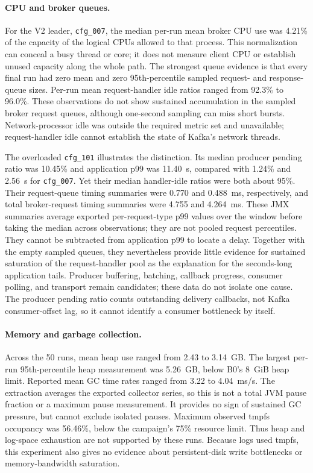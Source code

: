 \documentclass[10pt]{article}
\begin{document}
\paragraph{CPU and broker queues.}
For the V2 leader, \texttt{cfg\_007}, the median per-run mean broker CPU use
was 4.21\% of the capacity of the logical CPUs allowed to that process. This normalization
can conceal a busy thread or core; it does not measure client CPU or establish
unused capacity along the whole path. The strongest queue evidence is that
every final run had zero mean and zero 95th-percentile sampled request- and
response-queue sizes. Per-run mean request-handler idle ratios ranged from
92.3\% to 96.0\%. These observations do not show sustained accumulation in
the sampled broker request queues, although one-second sampling can miss
short bursts. Network-processor idle was outside the required metric set and unavailable;
request-handler idle cannot establish the state of Kafka's network threads.

The overloaded \texttt{cfg\_101} illustrates the distinction. Its median
producer pending ratio was 10.45\% and application p99 was 11.40~s, compared
with 1.24\% and 2.56~s for \texttt{cfg\_007}. Yet their median handler-idle
ratios were both about 95\%. Their request-queue timing summaries were
0.770 and 0.488~ms, respectively, and total broker-request timing summaries
were 4.755 and 4.264~ms. These JMX summaries average exported per-request-type
p99 values over the window before taking the median across observations; they
are not pooled request percentiles. They cannot be subtracted from
application p99 to locate a delay. Together with the empty sampled queues,
they nevertheless provide little evidence for sustained saturation of the
request-handler pool as the explanation for the seconds-long application
tails. Producer buffering, batching, callback progress, consumer polling,
and transport remain candidates; these data do not isolate one cause.
The producer pending ratio counts outstanding delivery callbacks, not Kafka
consumer-offset lag, so it cannot identify a consumer bottleneck by itself.

\paragraph{Memory and garbage collection.}
Across the 50 runs, mean heap use ranged from 2.43 to 3.14~GB. The largest
per-run 95th-percentile heap measurement was 5.26~GB, below B0's 8~GiB heap
limit. Reported mean GC time rates ranged from 3.22 to 4.04~ms/s.
The extraction averages the exported collector series, so this is not a
total JVM pause fraction or a maximum pause measurement. It provides no
sign of sustained GC pressure, but cannot exclude isolated pauses.
Maximum observed tmpfs occupancy was 56.46\%, below the campaign's 75\%
resource limit. Thus heap and log-space exhaustion are not supported by
these runs. Because logs used tmpfs, this experiment also gives no evidence
about persistent-disk write bottlenecks or memory-bandwidth saturation.
\end{document}
